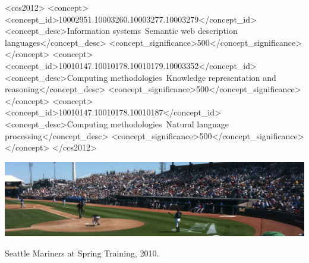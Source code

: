 \documentclass[sigconf,anonymous]{acmart}
\begin{document}

\begin{CCSXML}
<ccs2012>
   <concept>
       <concept_id>10002951.10003260.10003277.10003279</concept_id>
       <concept_desc>Information systems~Semantic web description languages</concept_desc>
       <concept_significance>500</concept_significance>
   </concept>
   <concept>
       <concept_id>10010147.10010178.10010179.10003352</concept_id>
       <concept_desc>Computing methodologies~Knowledge representation and reasoning</concept_desc>
       <concept_significance>500</concept_significance>
   </concept>
   <concept>
       <concept_id>10010147.10010178.10010187</concept_id>
       <concept_desc>Computing methodologies~Natural language processing</concept_desc>
       <concept_significance>500</concept_significance>
   </concept>
</ccs2012>
\end{CCSXML}



\begin{teaserfigure}
  \includegraphics[width=\textwidth]{sampleteaser}
  \caption{Seattle Mariners at Spring Training, 2010.}
  \label{fig:teaser}
\end{teaserfigure}

\maketitle



%
%
\end{document}
